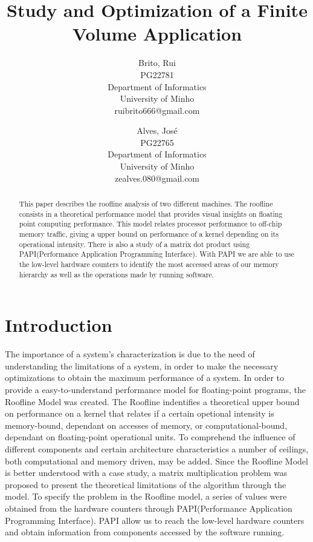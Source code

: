 \documentclass[a4paper,10pt,openright,openbib,twocolumn]{article}
\begin{document}
\begin{multicols}{2}
\title{Study and Optimization of a Finite Volume Application}
\author{
    Brito, Rui\\
    PG22781\\
    Department of Informatics\\
    University of Minho\\
    ruibrito666@gmail.com
  \and
    Alves, José\\
    PG22765\\
    Department of Informatics\\
    University of Minho\\
    zealves.080@gmail.com
}
\date{}
\maketitle
\end{multicols}

\begin{abstract}
	This paper describes the roofline\cite{roofline} analysis of two different machines. The roofline consists in a theoretical performance model that provides visual insights on floating point computing performance. This model relates processor performance to off-chip memory traffic, giving a upper bound on performance of a kernel depending on its operational intensity. There is also a study of a matrix dot product using PAPI(Performance Application Programming Interface)\cite{papi}. With PAPI we are able to use the low-level hardware counters to identify the most accessed areas of our memory hierarchy as well as the operations made by running software.  
\end{abstract}

\section{Introduction}
The importance of a system’s characterization is due to the need of understanding the limitations of a system, in order to make the necessary optimizations to obtain the maximum performance of a system. In order to provide a easy-to-understand performance model for floating-point programs, the Roofline Model was created. The Roofline indentifies a theoretical upper bound on performance on a kernel that relates if a certain opetional intensity is memory-bound, dependant on accesses of memory, or computational-bound, dependant on floating-point operational units. To comprehend the influence of different components and certain architecture characteristics a number of ceilings, both computational and memory driven, may be added. Since the Roofline Model is better understood with a case study, a matrix multiplication problem was proposed to present the theoretical limitations of the algorithm through the model. To specify the problem in the Roofline model, a series of values were obtained from the hardware counters through PAPI(Performance Application Programming Interface). PAPI allow us to reach the low-level hardware counters and obtain information from components accessed by the software running. 
\end{document}
